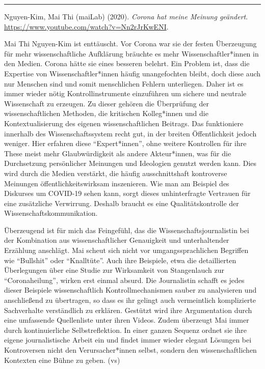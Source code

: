 \documentclass[a4paper,
fontsize=11pt,
oneside,
numbers=noperiodatend,
parskip=half-,
bibliography=totoc,
final
]{scrartcl}
\begin{document}
\begin{center}\rule{0.5\linewidth}{0.5pt}\end{center}

Nguyen-Kim, Mai Thi (maiLab) (2020). \emph{Corona hat meine Meinung
geändert}. \url{https://www.youtube.com/watch?v=Nn2rJrKwENI}.

Mai Thi Nguyen-Kim ist enttäuscht. Vor Corona war sie der festen
Überzeugung für mehr wissenschaftliche Aufklärung bräuchte es mehr
Wissenschaftler*innen in den Medien. Corona hätte sie eines besseren
belehrt. Ein Problem ist, dass die Expertise von Wissenschaftler*innen
häufig unangefochten bleibt, doch diese auch nur Menschen sind und somit
menschlichen Fehlern unterliegen. Daher ist es immer wieder nötig
Kontrollinstrumente einzuführen um sichere und neutrale Wissenschaft zu
erzeugen. Zu dieser gehören die Überprüfung der wissenschaftlichen
Methoden, die kritischen Kolleg*innen und die Kontextualisierung des
eigenen wissenschaftlichen Beitrags. Das funktioniere innerhalb des
Wissenschaftssystem recht gut, in der breiten Öffentlichkeit jedoch
weniger. Hier erfahren diese \enquote{Expert*innen}, ohne weitere
Kontrollen für ihre These meist mehr Glaubwürdigkeit als andere
Akteur*innen, was für die Durchsetzung persönlicher Meinungen und
Ideologien genutzt werden kann. Dies wird durch die Medien verstärkt,
die häufig ausschnittshaft kontroverse Meinungen öffentlichkeitswirksam
inszenieren. Wie man am Beispiel des Diskurses um COVID-19 sehen kann,
sorgt dieses unhinterfragte Vertrauen für eine zusätzliche Verwirrung.
Deshalb braucht es eine Qualitätskontrolle der
Wissenschaftskommunikation.

Überzeugend ist für mich das Feingefühl, das die
Wissenschaftsjournalistin bei der Kombination aus wissenschaftlicher
Genauigkeit und unterhaltender Erzählung anschlägt. Mai scheut sich
nicht vor umgangssprachlichen Begriffen wie \enquote{Bullshit} oder
\enquote{Knalltüte}. Auch ihre Beispiele, etwa die detaillierten
Überlegungen über eine Studie zur Wirksamkeit von Stangenlauch zur
\enquote{Coronaheilung}, wirken erst einmal absurd. Die Journalistin
schafft es jedes dieser Beispiele wissenschaftlich Kontrollmechanismen
sauber zu analysieren und anschließend zu übertragen, so dass es ihr
gelingt auch vermeintlich komplizierte Sachverhalte verständlich zu
erklären. Gestützt wird ihre Argumentation durch eine umfassende
Quellenliste unter ihren Videos. Zudem überzeugt Mai immer durch
kontinuierliche Selbstreflektion. In einer ganzen Sequenz ordnet sie
ihre eigene journalistische Arbeit ein und findet immer wieder elegant
Lösungen bei Kontroversen nicht den Verursacher*innen selbst, sondern
den wissenschaftlichen Kontexten eine Bühne zu geben. (vs)

\end{document}
